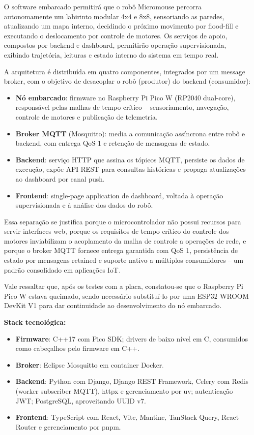     O software embarcado permitirá que o robô Micromouse percorra autonomamente um labirinto modular 4x4 e 8x8, sensoriando as paredes, atualizando um mapa interno, decidindo o próximo movimento por flood-fill e executando o deslocamento por controle de motores. Os serviços de apoio, compostos por backend e dashboard, permitirão operação supervisionada, exibindo trajetória, leituras e estado interno do sistema em tempo real.

    A arquitetura é distribuída em quatro componentes, integrados por um message broker, com o objetivo de desacoplar o robô (produtor) do backend (consumidor):
    \begin{itemize}
        \item \textbf{Nó embarcado}: firmware no Raspberry Pi Pico W (RP2040 dual-core), responsável pelas malhas de tempo crítico -- sensoriamento, navegação, controle de motores e publicação de telemetria.
        \item \textbf{Broker MQTT} (Mosquitto): media a comunicação assíncrona entre robô e backend, com entrega QoS 1 e retenção de mensagens de estado.
        \item \textbf{Backend}: serviço HTTP que assina os tópicos MQTT, persiste os dados de execução, expõe API REST para consultas históricas e propaga atualizações ao dashboard por canal push.
        \item \textbf{Frontend}: single-page application de dashboard, voltada à operação supervisionada e à análise dos dados do robô.
    \end{itemize}

    Essa separação se justifica porque o microcontrolador não possui recursos para servir interfaces web, porque os requisitos de tempo crítico do controle dos motores inviabilizam o acoplamento da malha de controle a operações de rede, e porque o broker MQTT fornece entrega garantida com QoS 1, persistência de estado por mensagens retained e suporte nativo a múltiplos consumidores -- um padrão consolidado em aplicações IoT.

    Vale ressaltar que, após os testes com a placa, constatou-se que o Raspberry Pi Pico W estava queimado, sendo necessário substituí-lo por uma ESP32 WROOM DevKit V1 para dar continuidade ao desenvolvimento do nó embarcado.
    
    \textbf{Stack tecnológica:}
    \begin{itemize}
        \item \textbf{Firmware}: C++17 com Pico SDK; drivers de baixo nível em C, consumidos como cabeçalhos pelo firmware em C++.
        \item \textbf{Broker}: Eclipse Mosquitto em container Docker.
        \item \textbf{Backend}: Python com Django, Django REST Framework, Celery com Redis (worker subscriber MQTT), httpx e gerenciamento por uv; autenticação JWT; PostgreSQL, aproveitando UUID v7.
        \item \textbf{Frontend}: TypeScript com React, Vite, Mantine, TanStack Query, React Router e gerenciamento por pnpm.
    \end{itemize}

